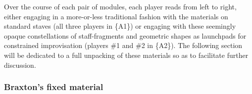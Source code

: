         Over the course of each pair of modules, each player reads from left to right, either engaging in a more-or-less traditional fashion with the materials on standard staves (all three players in \{A1\}) or engaging with these seemingly opaque constellations of staff-fragments and geometric shapes as launchpads for constrained improvisation (players \#1 and \#2 in \{A2\}). The following section will be dedicated to a full unpacking of these materials so as to facilitate further discussion.
    
        
    \subsubsection{Braxton's fixed material}


